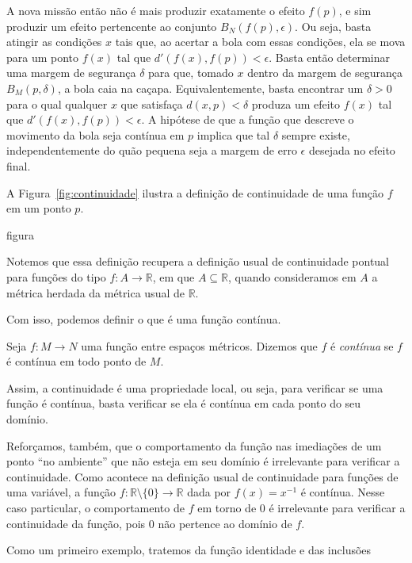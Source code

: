 A nova missão então não é mais produzir exatamente o efeito $f(p)$, e sim produzir um efeito pertencente ao conjunto $B_N(f(p), \epsilon)$.
Ou seja, basta atingir as condições $x$ tais que, ao acertar a bola com essas condições, ela se mova para um ponto $f(x)$ tal que $d'(f(x), f(p)) < \epsilon$.
Basta então determinar uma margem de segurança $\delta$ para que, tomado $x$ dentro da margem de segurança $B_M(p, \delta)$, a bola caia na caçapa.
Equivalentemente, basta encontrar um $\delta>0$ para o qual qualquer $x$ que satisfaça $d(x, p) < \delta$ produza um efeito $f(x)$ tal que $d'(f(x), f(p)) < \epsilon$.
A hipótese de que a função que descreve o movimento da bola seja contínua em $p$ implica que tal $\delta$ sempre existe, independentemente do quão pequena seja a margem de erro $\epsilon$ desejada no efeito final.

A Figura~\ref{fig:continuidade} ilustra a definição de continuidade de uma função $f$ em um ponto $p$.

{figura}

Notemos que essa definição recupera a definição usual de continuidade pontual para funções do tipo $f: A\rightarrow \mathbb R$, em que $A\subseteq \mathbb R$, quando consideramos em $A$ a métrica herdada da métrica usual de $\mathbb R$.

Com isso, podemos definir o que é uma função contínua.

\begin{definition}
    Seja $f: M \to N$ uma função entre espaços métricos.
    Dizemos que $f$ é \emph{contínua} se $f$ é contínua em todo ponto de $M$.
\end{definition}

Assim, a continuidade é uma propriedade local, ou seja, para verificar se uma função é contínua, basta verificar se ela é contínua em cada ponto do seu domínio.

Reforçamos, também, que o comportamento da função nas imediações de um ponto ``no ambiente'' que não esteja em seu domínio é irrelevante para verificar a continuidade.
Como acontece na definição usual de continuidade para funções de uma variável, a função $f:\mathbb R\setminus\{0\}\rightarrow \mathbb R$ dada por $f(x) = x^{-1}$ é contínua.
Nesse caso particular, o comportamento de $f$ em torno de $0$ é irrelevante para verificar a continuidade da função, pois $0$ não pertence ao domínio de $f$.



Como um primeiro exemplo, tratemos da função identidade e das inclusões

